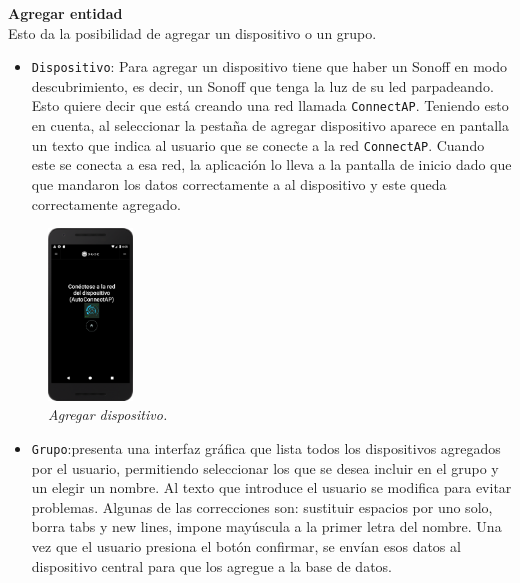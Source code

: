 \textbf{Agregar entidad}\\
Esto da la posibilidad de agregar un dispositivo o un grupo.\\
\begin{itemize}
  \item \lstinline[columns=fixed]{Dispositivo}: Para agregar un dispositivo tiene que haber un Sonoff en modo descubrimiento, es decir, un Sonoff que tenga la luz de su led parpadeando. Esto quiere decir que está creando una red llamada \lstinline[columns=fixed]{ConnectAP}. Teniendo esto en cuenta, al seleccionar la pestaña de agregar dispositivo  aparece en pantalla un texto que indica al usuario que se conecte a la red \lstinline[columns=fixed]{ConnectAP}. Cuando este se conecta a esa red, la aplicación lo lleva a la pantalla de inicio dado que que mandaron los datos correctamente a al dispositivo y este queda correctamente agregado.
\end{itemize}

\begin{figure}[H]
  \centering
  \includegraphics[width=0.2\textwidth, keepaspectratio]{images/app-movil-add-device}
  \caption{\textit{Agregar dispositivo.}}
  \label{fig:app-movil-add-device}
\end{figure}

 \begin{itemize}
  \item \lstinline[columns=fixed]{Grupo}:presenta una interfaz gráfica que lista todos los dispositivos agregados por el usuario, permitiendo seleccionar los que se desea incluir en el grupo y un elegir un nombre. Al texto que introduce el usuario se modifica para evitar problemas. Algunas de las correcciones son: sustituir espacios por uno solo, borra tabs y new lines, impone mayúscula a la primer letra del nombre. Una vez que el usuario presiona el botón confirmar, se envían esos datos al dispositivo central para que los agregue a la base de datos.
\end{itemize}

